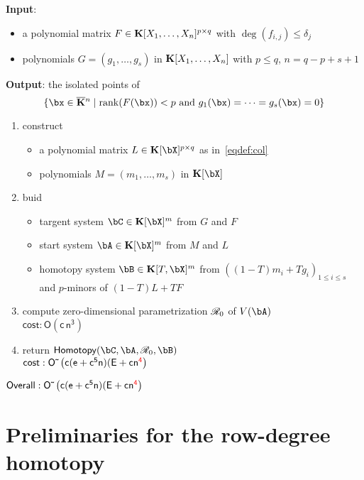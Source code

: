 \documentclass[12pt]{article}
\begin{document}
\begin{algorithm}
\caption{$\mathsf{Column-degreeHomotopy}$}
{\bf Input}:\begin{itemize}
\item a polynomial matrix $F \in \mathbf{K}[X_1, \ldots, X_n]^{p \times q}$ with $\deg(f_{i,j}) \leq \delta_j$
\item polynomials $G = (g_1, \ldots, g_s)$ in $\mathbf{K}[X_1, \ldots, X_n]$ with $p \leq q$, $n = q-p+s+1$
\end{itemize}
{\bf Output}: the isolated points of
$$\{\bx \in \KKbar{}^n \mid  \mathrm{rank}(\mF({\bx})) < p
\text{~and~} g_1(\bx)=\cdots=g_s(\bx)=0\}$$
\begin{enumerate}
\item construct \begin{itemize}
\item a polynomial matrix $L \in \KK[\bX]^{p \times q}$ as in~\ref{eqdef:col}
\item polynomials $M = (m_1, \ldots, m_s)$ in $\KK[\bX]$
\end{itemize}
\item buid 
\begin{itemize}
\item targent system $\bC \in \KK[\bX]^{m}$ from $G$ and $F$
\item start system $\bA \in \KK[\bX]^{m}$ from $M$ and $L$
\item homotopy system $\bB \in \KK[T,\bX]^{m}$ from $((1-T)m_i + Tg_i)_{1 \leq i \leq s}$ and $p$-minors of $(1-T)L + TF$
\end{itemize} 
\item compute zero-dimensional parametrization $\mathscr{R}_0$ of $V(\bA)$\\
$\mathsf{cost: O(c\,n^3)}$
\item return $\mathsf{Homotopy}(\bC,\bA,\scrR_0,\bB)$\\
$\mathsf{cost: {O}{\,\tilde{ }\,}\left (c(e+c^5 n)(E + cn^{\textcolor{red}{4}}\right)}$
\end{enumerate}
$\mathsf{Overall: {O}{\,\tilde{ }\,}\left (c(e+c^5 n)(E + cn^{\textcolor{red}{4}}\right)}$
\label{ColHom}
\end{algorithm}


\section{Preliminaries for the row-degree homotopy}
\end{document}

